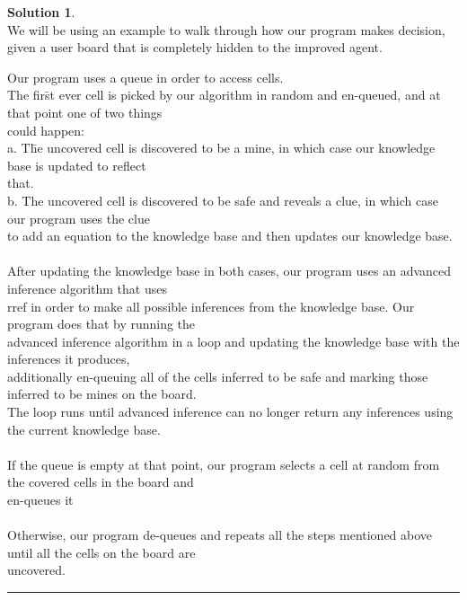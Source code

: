 \documentclass{article}
\theoremstyle{definition}
\def\fline{\rule{0.75\linewidth}{0.5pt}}
\newcommand{\finishline}{\vspace{-15pt}\begin{center}\fline\end{center}}
\newtheorem*{solution*}{Solution}
\newenvironment{solution}{\begin{solution*}}{{\finishline} \end{solution*}}
\begin{document}
\begin{solution} \hfill \\
	We will be using an example to walk through how our program makes decision, given a user board that is completely hidden to the improved agent. 
	\begin{tabbing}
	Our program uses a queue in order to access cells. \\
	The fir\=st ever cell is picked by our algorithm in random and en-queued, and at that point one of two things \\ could happen: \\
	
	\>a. T\=he uncovered cell is discovered to be a mine, in which case our knowledge base is updated to reflect\\ \>\>that. \\
	\>b. The uncovered cell is discovered to be safe and reveals a clue, in which case our program uses the clue\\ \>\>to add an equation to the knowledge base and then updates our knowledge base. \\\\
	
	After updating the knowledge base in both cases, our program uses an advanced inference algorithm that uses\\ rref in order to make all possible inferences from the knowledge base. Our program does that by running the\\ advanced inference algorithm in a loop and updating the knowledge base with the inferences it produces, \\additionally en-queuing all of the cells inferred to be safe and marking those inferred to be mines on the board.\\ The loop runs until advanced inference can no longer return any inferences using the current knowledge base.\\\\
	
	If the queue is empty at that point, our program selects a cell at random from the covered cells in the board and\\ en-queues it\\\\
	
	Otherwise, our program de-queues and repeats all the steps mentioned above until all the cells on the board are\\ uncovered.
	\end{tabbing}
\end{solution}
\end{document}

